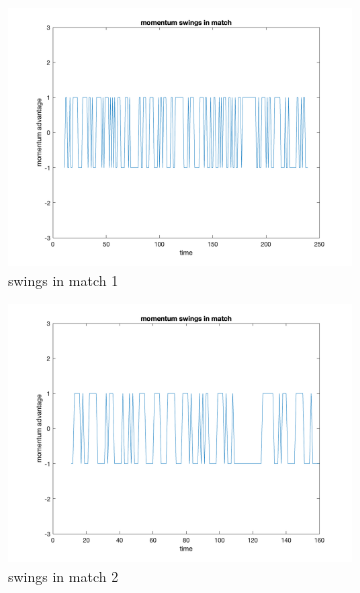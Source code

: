 \begin{figure}[H]
    \centering
    \begin{subfigure}[b]{0.34\textwidth}
        \includegraphics[width=\linewidth]{mainmatter/imgs/swing_match1.png}
        \caption{swings in match 1}
    \end{subfigure}\hspace{-0.02\textwidth}
    \begin{subfigure}[b]{0.34\textwidth}
        \includegraphics[width=\linewidth]{mainmatter/imgs/swing_match2.png}
        \caption{swings in match 2}
    \end{subfigure}\hspace{-0.02\textwidth}
    \begin{subfigure}[b]{0.34\textwidth}

\end{subfigure}
\end{figure}
